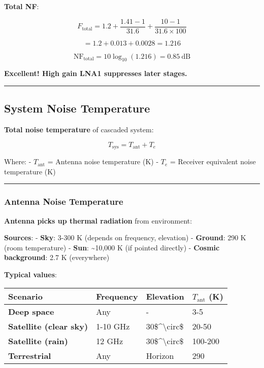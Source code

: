 \textbf{Total NF}:

\[
F_{\text{total}} = 1.2 + \frac{1.41 - 1}{31.6} + \frac{10 - 1}{31.6 \times 100}
\]

\[
= 1.2 + 0.013 + 0.0028 = 1.216
\]

\[
\text{NF}_{\text{total}} = 10\log_{10}(1.216) = 0.85\ \text{dB}
\]

\textbf{Excellent! High gain LNA1 suppresses later stages.}

\begin{center}\rule{0.5\linewidth}{0.5pt}\end{center}

\subsection{System Noise Temperature}\label{system-noise-temperature}

\textbf{Total noise temperature} of cascaded system:

\[
T_{\text{sys}} = T_{\text{ant}} + T_e
\]

Where: - \(T_{\text{ant}}\) = Antenna noise temperature (K) - \(T_e\) =
Receiver equivalent noise temperature (K)

\begin{center}\rule{0.5\linewidth}{0.5pt}\end{center}

\subsubsection{Antenna Noise
Temperature}\label{antenna-noise-temperature}

\textbf{Antenna picks up thermal radiation} from environment:

\textbf{Sources}: - \textbf{Sky}: 3-300 K (depends on frequency,
elevation) - \textbf{Ground}: 290 K (room temperature) - \textbf{Sun}:
\textasciitilde10,000 K (if pointed directly) - \textbf{Cosmic
background}: 2.7 K (everywhere)

\textbf{Typical values}:

{\def\LTcaptype{} %
\begin{longtable}[]{@{}llll@{}}
\toprule\noalign{}
Scenario & Frequency & Elevation & \(T_{\text{ant}}\) (K) \\
\midrule\noalign{}
\endhead
\bottomrule\noalign{}
\endlastfoot
\textbf{Deep space} & Any & - & 3-5 \\
\textbf{Satellite (clear sky)} & 1-10 GHz &
30\$\^{}\textbackslash circ\$ & 20-50 \\
\textbf{Satellite (rain)} & 12 GHz & 30\$\^{}\textbackslash circ\$ &
100-200 \\
\textbf{Terrestrial} & Any & Horizon & 290 \\
\end{longtable}
}

